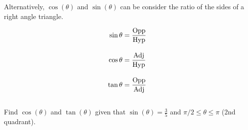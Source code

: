 \documentclass[mathNotesPreamble]{subfiles}
\begin{document}
    \begin{defn*}
    
      Alternatively, $\cos(\theta)$ and $\sin(\theta)$ can be consider the ratio of the sides of a right angle triangle.
      
      \begin{minipage}{0.5\linewidth}
      \end{minipage}%
      \begin{minipage}{0.5\linewidth}
        \begin{align*}
          \sin\theta&=\dfrac{\textnormal{Opp}}{\textnormal{Hyp}}\\[10pt]
          \cos\theta&=\dfrac{\textnormal{Adj}}{\textnormal{Hyp}}\\[10pt]
          \tan\theta&=\dfrac{\textnormal{Opp}}{\textnormal{Adj}}\\[10pt]
        \end{align*}
      \end{minipage}
    \end{defn*}
    \begin{ex*}
      Find $\cos(\theta)$ and $\tan(\theta)$ given that $\sin(\theta)=\frac{3}{5}$ and $\pi/2\leq \theta\leq \pi$ (2nd quadrant).
    \end{ex*}
    
\end{document}
